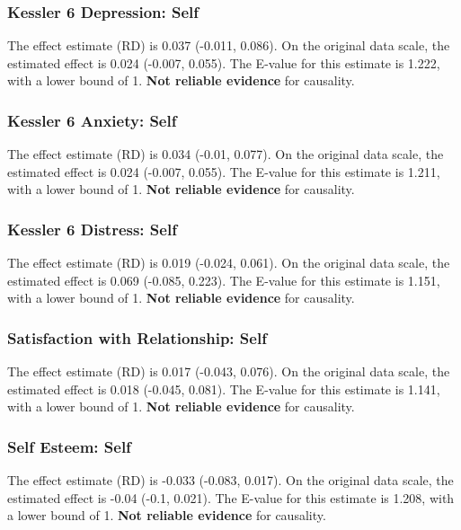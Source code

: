 \documentclass[
  singlecolumn]{article}
\begin{document}
\subsubsection{Kessler 6 Depression:
Self}\label{kessler-6-depression-self-9}

The effect estimate (RD) is 0.037 (-0.011, 0.086). On the original data
scale, the estimated effect is 0.024 (-0.007, 0.055). The E-value for
this estimate is 1.222, with a lower bound of 1. \textbf{Not reliable
evidence} for causality.

\subsubsection{Kessler 6 Anxiety: Self}\label{kessler-6-anxiety-self-9}

The effect estimate (RD) is 0.034 (-0.01, 0.077). On the original data
scale, the estimated effect is 0.024 (-0.007, 0.055). The E-value for
this estimate is 1.211, with a lower bound of 1. \textbf{Not reliable
evidence} for causality.

\subsubsection{Kessler 6 Distress:
Self}\label{kessler-6-distress-self-9}

The effect estimate (RD) is 0.019 (-0.024, 0.061). On the original data
scale, the estimated effect is 0.069 (-0.085, 0.223). The E-value for
this estimate is 1.151, with a lower bound of 1. \textbf{Not reliable
evidence} for causality.

\subsubsection{Satisfaction with Relationship:
Self}\label{satisfaction-with-relationship-self-9}

The effect estimate (RD) is 0.017 (-0.043, 0.076). On the original data
scale, the estimated effect is 0.018 (-0.045, 0.081). The E-value for
this estimate is 1.141, with a lower bound of 1. \textbf{Not reliable
evidence} for causality.

\subsubsection{Self Esteem: Self}\label{self-esteem-self-9}

The effect estimate (RD) is -0.033 (-0.083, 0.017). On the original data
scale, the estimated effect is -0.04 (-0.1, 0.021). The E-value for this
estimate is 1.208, with a lower bound of 1. \textbf{Not reliable
evidence} for causality.
\end{document}
